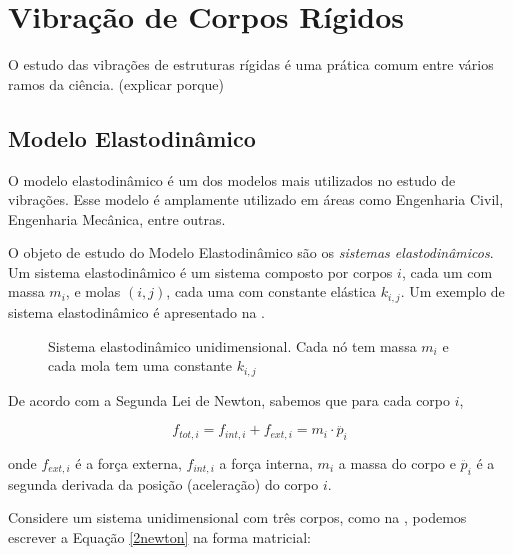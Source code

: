 \section{Vibração de Corpos Rígidos}
O estudo das vibrações de estruturas rígidas é uma prática comum entre vários ramos da ciência. (explicar porque)

\subsection{Modelo Elastodinâmico}
O modelo elastodinâmico \cite{shabana2012theory} é um dos modelos mais utilizados no estudo de vibrações. Esse modelo é amplamente utilizado em áreas como Engenharia Civil, Engenharia Mecânica, entre outras. 

O objeto de estudo do Modelo Elastodinâmico são os \emph{sistemas elastodinâmicos}. Um sistema elastodinâmico é um sistema composto por corpos $i$, cada um com massa $m_i$, e molas $(i,j)$, cada uma com constante elástica $k_{i,j}$. Um exemplo de sistema elastodinâmico é apresentado na .

\begin{figure}[ht]
	\centering
	
	\caption[Sistema elastodinâmico unidimensional]{Sistema elastodinâmico unidimensional. Cada nó tem massa $m_i$ e cada mola tem uma constante $k_{i,j}$}\label{1dbodysystem}
\end{figure}

De acordo com a Segunda Lei de Newton, sabemos que para cada corpo $i$,

\begin{equation}
f_{tot,i} = f_{int,i} + f_{ext, i} = m_i \cdot \ddot{p_i}
\label{2newton}
\end{equation}

onde $f_{ext,i}$ é a força externa,  $f_{int,i}$ a força interna, $m_i$ a massa do corpo e $\ddot{p_i}$ é a segunda derivada da posição (aceleração) do corpo $i$.  

Considere um sistema unidimensional com três corpos, como na , podemos escrever a Equação \eqref{2newton} na forma matricial:

